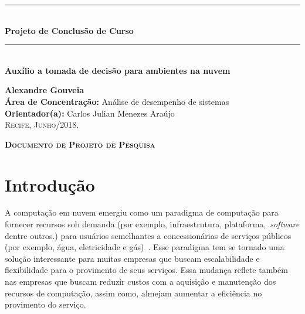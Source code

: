 \documentclass[openany, a4paper,12pt, oneside]{article}
\begin{document}
\pagestyle{empty}
\begin{flushright}
	\noindent\rule{15cm}{0.4pt}\\[0.5cm]
	\textbf{{ \LARGE Projeto de Conclus\~{a}o de Curso}}\\[0.1cm]
	\noindent\rule{15cm}{0.4pt}\\[7cm]
	\textbf{{ \Large Auxílio a tomada de decisão para ambientes na nuvem}}\\[4cm]
\end{flushright}

\begin{center}	
	\textbf{\large Alexandre Gouveia}\\[3cm]	
	
	\textbf{\large \'{A}rea de Concentra\c{c}\~{a}o:} Análise de desempenho de sistemas\\	
	\textbf{\large Orientador(a):} Carlos Julian Menezes Araújo\\[2cm]
	\vfill
	\textsc{Recife, Junho/2018}.
\end{center}
\pagebreak
{}

\begin{center}	
	\textbf{\textsc{\large Documento de Projeto de Pesquisa}}\\[1cm]
\end{center}



\section{Introdução}
\label{intro}

A computação em nuvem emergiu como um paradigma de computação para fornecer recursos
sob demanda (por exemplo, infraestrutura, plataforma,~\textit{software} dentre outros.) para usuários semelhantes
a concessionárias de serviços públicos (por exemplo, água, eletricidade e gás)~\cite{Sanket2018}.
Esse paradigma tem se tornado uma solução interessante para muitas empresas que buscam
escalabilidade e flexibilidade para o provimento de seus serviços. Essa mudança reflete
também nas empresas que buscam reduzir custos com a aquisição e manutenção dos recursos de computação,
assim como, almejam aumentar a eficiência no provimento do serviço.
\end{document}
